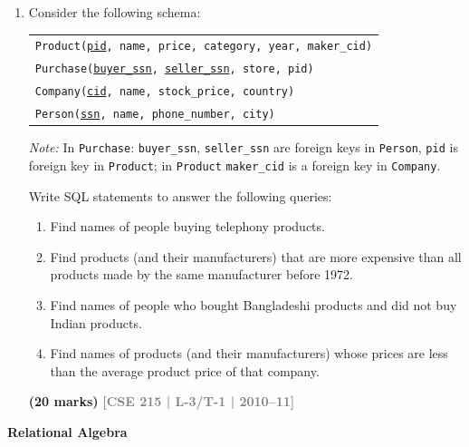 \documentclass[12pt,a3paper]{article}
\newcommand{\yr}[1]{\hfill\textcolor{gray}{\small\textbf{[#1]}}}
\newcommand{\mk}[1]{\textcolor{orange!70!black}{\small\textbf{(#1 marks)}}}
\newcommand{\subtopic}[2]{%
  \vspace{10pt}
  \noindent\begin{tcolorbox}[colback=#1!8,colframe=#1,boxrule=0.6pt,arc=4pt,
    left=6pt,right=6pt,top=4pt,bottom=4pt]
    \small\bfseries\textcolor{#1}{#2}
  \end{tcolorbox}
  \vspace{2pt}
}
\begin{document}
\begin{enumerate}
\begin{enumerate}
\item  Delete all laptops made by a manufacturer that does not make printers.
\mk{5} \yr{CSE 303 | L-3/T-1 | 2011--12}

\item Assume that manufacturer A bought manufacturer B. Change all products made by B so that they are now made by A.
\mk{5} \yr{CSE 303 | L-3/T-1 | 2011--12}
\end{enumerate}
\item Consider the following schema:
\begin{center}
\begin{tabular}{l}
\texttt{Product(\underline{pid}, name, price, category, year, maker\_cid)}\\
\texttt{Purchase(\underline{buyer\_ssn}, \underline{seller\_ssn}, store, pid)}\\
\texttt{Company(\underline{cid}, name, stock\_price, country)}\\
\texttt{Person(\underline{ssn}, name, phone\_number, city)}
\end{tabular}
\end{center}
\textit{Note:} In \texttt{Purchase}: \texttt{buyer\_ssn}, \texttt{seller\_ssn} are foreign keys in \texttt{Person}, \texttt{pid} is foreign key in \texttt{Product}; in \texttt{Product} \texttt{maker\_cid} is a foreign key in \texttt{Company}.

Write SQL statements to answer the following queries:
\begin{enumerate}
  \item Find names of people buying telephony products.
  \item Find products (and their manufacturers) that are more expensive than all products made by the same manufacturer before 1972.
  \item Find names of people who bought Bangladeshi products and did not buy Indian products.
  \item Find names of products (and their manufacturers) whose prices are less than the average product price of that company.
\end{enumerate}
\mk{20} \yr{CSE 215 | L-3/T-1 | 2010--11}

\end{enumerate}

\subtopic{cB}{Relational Algebra}
\label{sub:s3-relalg}
\end{document}
